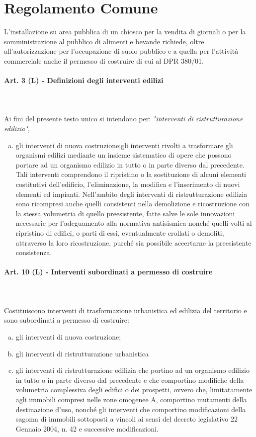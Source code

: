 \section{Regolamento Comune}

L’installazione su area pubblica di un chiosco per la vendita di giornali o per la somministrazione al pubblico di alimenti e bevande richiede, oltre all’autorizzazione per l’occupazione di suolo pubblico e a quella per l’attività commerciale anche il permesso di costruire di cui al DPR 380/01.


\paragraph{Art. 3 (L) - Definizioni degli interventi edilizi} ~\\~\\
\noindent
Ai fini del presente testo unico si intendono per: \textit{"interventi di ristrutturazione edilizia"}, 

\begin{enumerate}[a)]
	\item gli interventi di nuova costruzione;gli interventi rivolti a trasformare gli organismi edilizi mediante un insieme sistematico di opere che possono portare ad un organismo edilizio in tutto o in parte diverso dal precedente. Tali interventi comprendono il ripristino o la sostituzione di alcuni elementi costitutivi dell'edificio, l’eliminazione, la modifica e l'inserimento di nuovi elementi ed impianti. Nell'ambito degli interventi di ristrutturazione edilizia sono ricompresi anche quelli consistenti nella demolizione e ricostruzione con la stessa volumetria di quello preesistente, fatte salve le sole innovazioni necessarie per l'adeguamento alla normativa antisismica nonché quelli volti al ripristino di edifici, o parti di essi, eventualmente crollati o demoliti, attraverso la loro ricostruzione, purché sia possibile accertarne la preesistente consistenza. 
\end{enumerate}
\paragraph{Art. 10 (L) - Interventi subordinati a permesso di costruire} ~\\ ~\\
\noindent
Costituiscono interventi di trasformazione urbanistica ed edilizia del territorio e sono subordinati a permesso di costruire:
\begin{enumerate}[a)]
	\item gli interventi di nuova costruzione;
	\item gli interventi di ristrutturazione urbanistica
	\item gli interventi di ristrutturazione edilizia che portino ad un organismo edilizio in tutto o in parte diverso dal precedente e che comportino modifiche della volumetria complessiva degli edifici o dei prospetti, ovvero che, limitatamente agli immobili compresi nelle zone omogenee A, comportino mutamenti della destinazione d’uso, nonché gli interventi che comportino modificazioni della sagoma di immobili sottoposti a vincoli ai sensi del decreto legislativo 22 Gennaio 2004, n. 42 e successive modificazioni.
\end{enumerate}